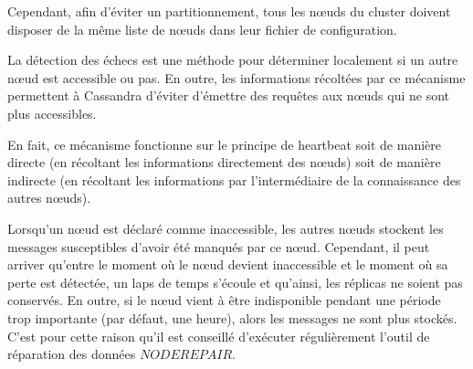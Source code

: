 Cependant, afin d'éviter un partitionnement, tous les nœuds du cluster doivent disposer de la même liste de nœuds dans leur fichier de configuration.

La détection des échecs est une méthode pour déterminer localement si un autre nœud est accessible ou pas. En outre, les informations récoltées par ce mécanisme permettent à Cassandra d'éviter d'émettre des requêtes aux nœuds qui ne sont plus accessibles.

En fait, ce mécanisme fonctionne sur le principe de heartbeat soit de manière directe (en récoltant les informations directement des nœuds) soit de manière indirecte (en récoltant les informations par l'intermédiaire de la connaissance des autres nœuds).

Lorsqu'un nœud est déclaré comme inaccessible, les autres nœuds stockent les messages susceptibles d'avoir été manqués par ce nœud. Cependant, il peut arriver qu'entre le moment où le nœud devient inaccessible et le moment où sa perte est détectée, un laps de temps s'écoule et qu'ainsi, les réplicas ne soient pas conservés. En outre, si le nœud vient à être indisponible pendant une période trop importante (par défaut, une heure), alors les messages ne sont plus stockés. C'est pour cette raison qu'il est conseillé d'exécuter régulièrement l'outil de réparation des données $NODE REPAIR$.